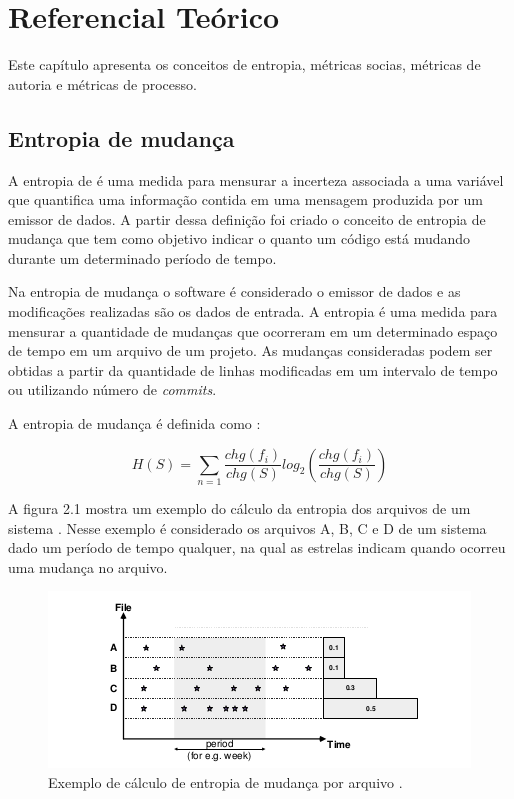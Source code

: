 \chapter{Referencial Teórico}
Este capítulo apresenta os conceitos de entropia, métricas socias, métricas de autoria e métricas de processo.

\section{Entropia de mudança}
A entropia de  é uma medida para mensurar a incerteza associada a uma variável que quantifica uma informação contida em uma mensagem produzida por um emissor de dados. A partir dessa definição foi criado o conceito de entropia de mudança que tem como objetivo indicar o quanto um código está mudando durante um determinado período de tempo. 

Na entropia de mudança o software é considerado o emissor de dados e as modificações realizadas são os dados de entrada. A entropia é uma medida para mensurar a quantidade de mudanças que ocorreram em um determinado espaço de tempo em um arquivo de um projeto. As mudanças consideradas podem ser obtidas a partir da quantidade de linhas modificadas em um intervalo de tempo ou utilizando número de \textit{commits}.

A entropia de mudança é definida como \cite{Hassan:2009:PFU:1555001.1555024}:

\begin{equation}
H(S) = {\sum\limits_{n=1} }\frac{chg(f_i)}{chg(S)}log_2(\frac{chg(f_i)}{chg(S)})
\end{equation}

A figura 2.1 mostra um exemplo do cálculo da entropia dos arquivos de um sistema \cite{Hassan:2009:PFU:1555001.1555024}. Nesse exemplo é considerado os arquivos A, B, C e D de um sistema dado um período de tempo qualquer, na qual as estrelas indicam quando ocorreu uma mudança no arquivo.

\begin{figure}[h]
	\captionsetup{justification=centering}
	\includegraphics[width=\linewidth]{entropiamudanca.png}
	\caption{Exemplo de cálculo de entropia de mudança por arquivo \cite{Hassan:2009:PFU:1555001.1555024}.}
	\label{figura:entropiaimagem}
\end{figure}

